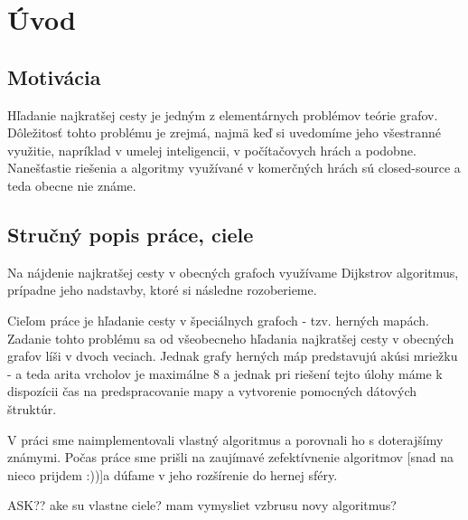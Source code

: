 \chapter*{Úvod}

\section{Motivácia}
Hľadanie najkratšej cesty je jedným z elementárnych problémov teórie grafov.
Dôležitosť tohto problému je zrejmá, najmä keď si uvedomíme jeho všestranné využitie, napríklad v 
umelej inteligencii, v počítačovych hrách a podobne. Nanešťastie riešenia a algoritmy využívané v komerčných hrách 
sú closed-source a teda obecne nie známe.

\section{Stručný popis práce, ciele}
Na nájdenie najkratšej cesty v obecných grafoch využívame Dijkstrov algoritmus, prípadne jeho nadstavby, ktoré si následne rozoberieme.

Cieľom práce je hľadanie cesty v špeciálnych grafoch - tzv. herných mapách. 
Zadanie tohto problému sa od všeobecneho hľadania najkratšej cesty v obecných grafov líši v dvoch veciach.
Jednak grafy herných máp predstavujú akúsi mriežku - a teda arita vrcholov je maximálne 8 a jednak pri riešení tejto úlohy máme k dispozícii čas
na predspracovanie mapy a vytvorenie pomocných dátových štruktúr.


V práci sme naimplementovali vlastný algoritmus a porovnali ho s doterajšímy známymi.
Počas práce sme prišli na zaujímavé zefektívnenie algoritmov [snad na nieco prijdem :))]a dúfame v jeho rozšírenie do hernej sféry.

ASK?? ake su vlastne ciele? mam vymysliet vzbrusu novy algoritmus?